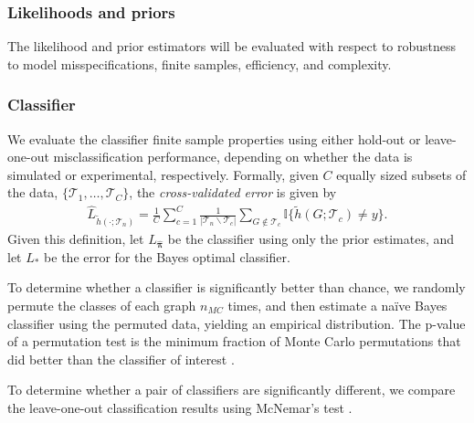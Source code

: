 \documentclass[10pt,journal,cspaper,compsoc]{IEEEtran}
\newcommand{\II}{\mathbb{I}}           %
\providecommand{\mc}[1]{\mathcal{#1}}
\providecommand{\mh}[1]{\hat{#1}}
\providecommand{\mt}[1]{\widetilde{#1}}
\providecommand{\mhb}[1]{\hat{\boldsymbol{#1}}}
\begin{document}
\subsubsection{Likelihoods and priors} %
\label{ssub:likelihoods_and_priors}

The likelihood and prior estimators will be evaluated with respect to robustness to model misspecifications, finite samples, efficiency, and complexity.




\subsubsection{Classifier} %
\label{ssub:classifier}

We evaluate the classifier finite sample properties using either hold-out or leave-one-out misclassification performance, depending on whether the data is simulated or experimental, respectively.  Formally, given $C$ equally sized subsets of the data, $\{\mc{T}_{1}, \ldots, \mc{T}_{C}\}$, the \emph{cross-validated error} is given by
\begin{align} \label{eq:L2}
	\mh{L}_{\mt{h}(\cdot; \mc{T}_n)} = \frac{1}{C}\sum_{c=1}^C \frac{1}{|\mc{T}_n \backslash \mc{T}_c|}\sum_{G \notin \mc{T}_c} \II\{\mt{h}(G; \mc{T}_{c}) \neq y\}.
\end{align}
Given this definition, let $L_{\mhb{\pi}}$ be the classifier using only the prior estimates, and let $L_*$ be the error for the Bayes optimal classifier.  

To determine whether a classifier is significantly better than chance, we randomly permute the classes of each graph $n_{MC}$ times, and then estimate a na\"ive Bayes classifier using the permuted data, yielding an empirical distribution.  The p-value of a permutation test is the minimum fraction of Monte Carlo permutations that did better than the classifier of interest \cite{Good2010}.  

To determine whether a pair of classifiers are significantly different, we compare the leave-one-out classification results using McNemar's test \cite{McNemar1947}.
\end{document}
